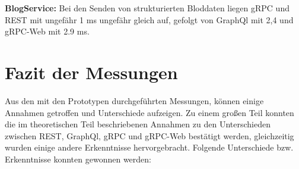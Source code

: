 \textbf{BlogService:}  
Bei den Senden von strukturierten Bloddaten liegen gRPC und REST mit ungefähr 1 ms ungefähr gleich auf, gefolgt von GraphQl mit 2,4 und gRPC-Web mit 2.9 ms.

\clearpage
\section*{Fazit der Messungen}
Aus den mit den Prototypen durchgeführten Messungen, können einige Annahmen getroffen und Unterschiede aufzeigen. Zu einem großen Teil konnten die im theoretischen Teil beschriebenen Annahmen zu den Unterschieden zwischen REST, GraphQl, gRPC und gRPC-Web bestätigt werden, gleichzeitig wurden einige andere Erkenntnisse hervorgebracht. Folgende Unterschiede bzw. Erkenntnisse konnten gewonnen werden:

\chapterend